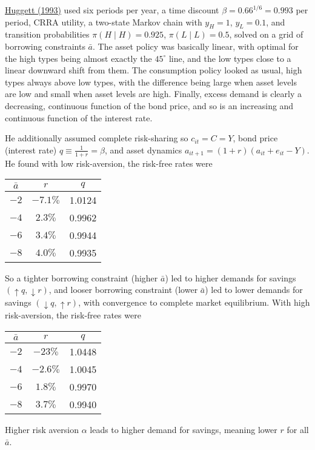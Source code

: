 \documentclass[10pt]{article}
\begin{document}
\begin{example}
	\href{https://www.sciencedirect.com/science/article/pii/016518899390024M}{Huggett (1993)} used six periods per year, a time discount $\beta = 0.66^{1/6} = 0.993$ per period, CRRA utility, a two-state Markov chain with $y_H = 1$, $y_L = 0.1$, and transition probabilities $\pi(H\mid H) = 0.925$, $\pi( L \mid L) = 0.5$, solved on a grid of borrowing constraints $\bar{a}$. The asset policy was basically linear, with optimal for the high types being almost exactly the $45^\circ$ line, and the low types close to a linear downward shift from them. The consumption policy looked as usual, high types always above low types, with the difference being large when asset levels are low and small when asset levels are high. Finally, excess demand is clearly a decreasing, continuous function of the bond price, and so is an increasing and continuous function of the interest rate.
	
	He additionally assumed complete risk-sharing so $c_{it} = C = Y$, bond price (interest rate) $q \equiv \frac{1}{1+r} = \beta$, and asset dynamics $a_{it+1} = (1+r)(a_{it} + e_{it} - Y)$. He found with low risk-aversion, the risk-free rates were 
	
	\begin{center}
	\begin{tabular}{c|c|c}
		$\bar{a}$ & $r$ & $q$ \\\hline
		$-2$ & $-7.1\%$ & 1.0124 \\
		$-4$ & $2.3\%$ & 0.9962 \\
		$-6$ & $3.4\%$ & 0.9944 \\
		$-8$ & $4.0\%$ & 0.9935 \\
	\end{tabular}
	\end{center}
	So a tighter borrowing constraint (higher $\bar{a}$) led to higher demands for savings $(\uparrow q, \downarrow r)$, and looser borrowing constraint (lower $\bar{a}$) led to lower demands for savings $(\downarrow q, \uparrow r)$, with convergence to complete market equilibrium. With high risk-aversion, the risk-free rates were
	\begin{center}
	\begin{tabular}{c|c|c}
		$\bar{a}$ & $r$ & $q$ \\\hline
		$-2$ & $-23\%$ & 1.0448 \\
		$-4$ & $-2.6\%$ & 1.0045 \\
		$-6$ & $1.8\%$ & 0.9970 \\
		$-8$ & $3.7\%$ & 0.9940 \\
	\end{tabular}
	\end{center}
	Higher risk aversion $\alpha$ leads to higher demand for savings, meaning lower $r$ for all $\bar{a}$.
\end{example}
\end{document}
